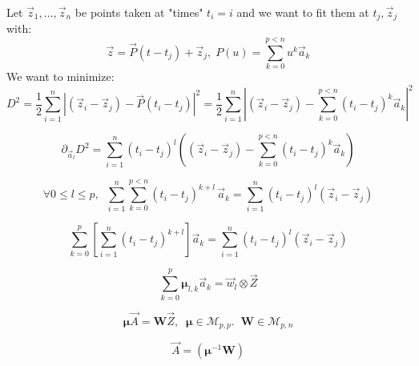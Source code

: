 \documentclass[aps,12pt]{revtex4}
\begin{document}
Let $\vec{z}_1,\ldots,\vec{z}_n$ be points taken at "times" $t_i=i$ and
we want to fit them at $t_j,\vec{z}_j$ with:
\begin{equation}
	\vec{z} = \vec{P}(t-t_j) + \vec{z}_j, \; P(u) = \sum_{k=0}^{p<n} u^k \vec{a}_k
\end{equation}
We want to minimize:
\begin{equation}
	D^2 = \dfrac{1}{2} \sum_{i=1}^n \left\vert
	\left(\vec{z}_i - \vec{z}_j\right) - \vec{P}(t_i-t_j)
	\right\vert^2 = \dfrac{1}{2} \sum_{i=1}^n \left\vert \left(\vec{z}_i - \vec{z}_j\right)  - \sum_{k=0}^{p<n} (t_i-t_j)^k \vec{a}_k
	\right\vert^2
\end{equation}

\begin{equation}
	\partial_{\vec{a}_l} D^2 = \sum_{i=1}^n (t_i-t_j)^l \left( \left(\vec{z}_i - \vec{z}_j\right)  
	- \sum_{k=0}^{p<n} (t_i-t_j)^k \vec{a}_k \right)
\end{equation}

\begin{equation}
\forall 0 \leq l \leq p, \;\; \sum_{i=1}^n  \sum_{k=0}^{p<n} (t_i-t_j)^{k+l} \, \vec{a}_k 
= \sum_{i=1}^n (t_i-t_j)^l \left(\vec{z}_i - \vec{z}_j\right) 
\end{equation}

\begin{equation}
	\sum_{k=0}^{p} \left[\sum_{i=1}^n (t_i-t_j)^{k+l} \right] \vec{a}_k = \sum_{i=1}^n (t_i-t_j)^l \left(\vec{z}_i - \vec{z}_j\right) 
\end{equation}

\begin{equation}
	\sum_{k=0}^{p} \bm{\mu}_{l,k} \vec{a}_k = \vec{w}_l \otimes \vec{Z}
\end{equation}
	

\begin{equation}
	\bm{\mu} \vec{A} = \bm{W} \vec{Z},\;\;\bm{\mu} \in \mathcal{M}_{p,p}.\;\;\bm{W} \in \mathcal{M}_{p,n}
\end{equation}

\begin{equation}
	\vec{A} = \left(\bm{\mu}^{-1}\bm{W}\right)
\end{equation}
\end{document}
